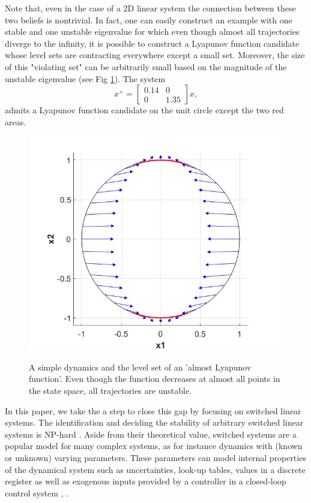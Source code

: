 Note that, even in the case of a 2D linear system the connection between these two beliefs is nontrivial. In fact, one can easily construct an example with one stable and one unstable eigenvalue for which even though almost all trajectories diverge to the infinity, it is possible to construct a Lyapunov function candidate whose level sets are contracting everywhere except a small set. 
Moreover, the size of this "violating set" can be arbitrarily small based on the magnitude of the unstable eigenvalue (see Fig \ref{fig:levelset}). 
The system
\[
x^+ = \begin{bmatrix}
0.14 & 0\\
0 & 1.35
\end{bmatrix}x,
\]
admits a Lyapunov function candidate on the unit circle except the two red areas.
\begin{figure}
\includegraphics[scale=0.35]{ex1.jpg}
\label{fig:levelset}
\caption{A simple dynamics and the level set of an 'almost Lyapunov function'. Even though the function decreases at almost all points in the state space, all trajectories are unstable.}
\end{figure}


In this paper, we take the a step to close this gap by focusing on switched linear systems. The identification and deciding the stability of arbitrary switched linear systems is NP-hard \cite{jungersBook}. Aside from their theoretical value, switched systems are a popular model for many complex systems, as for instance dynamics with (known or unknown) varying parameters. These parameters can model internal properties of the dynamical system such as uncertainties, look-up tables, values in a discrete register as well as exogenous inputs provided by a controller in a closed-loop control system \cite{liberzon-switching}, \cite{sun-ge}.

